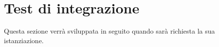 \section{Test di integrazione}
Questa sezione verrà sviluppata in seguito quando sarà richiesta la sua istanziazione.
